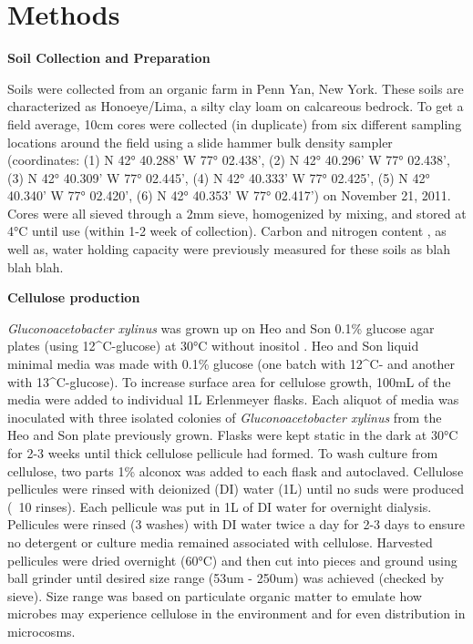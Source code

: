 \section{Methods}


\textbf{Soil Collection and Preparation}



Soils were collected from an organic farm in Penn Yan, New York.  These soils are characterized as Honoeye/Lima, a silty clay loam on calcareous bedrock.  To get a field average, 10cm cores were collected (in duplicate) from six different sampling locations around the field using a slide hammer bulk density sampler (coordinates: (1) N 42° 40.288’ W 77° 02.438’, (2) N 42° 40.296’ W 77° 02.438’, (3) N 42° 40.309’ W 77° 02.445’, (4) N 42° 40.333’ W 77° 02.425’, (5) N 42° 40.340’ W 77° 02.420’, (6) N 42° 40.353’ W 77° 02.417’) on November 21, 2011.   Cores were all sieved through a 2mm sieve, homogenized by mixing, and stored at 4°C until use (within 1-2 week of collection).  Carbon and nitrogen content , as well as, water holding capacity were previously measured for these soils as blah blah blah.     



\textbf{Cellulose production}



\textit{Gluconoacetobacter xylinus} was grown up on Heo and Son 0.1\% glucose agar plates (using 12^{C}-glucose) at 30°C without inositol \cite{Heo_Son_2002}.  Heo and Son liquid minimal media was made with 0.1\% glucose (one batch with 12^{C}- and another with 13^{C}-glucose).  To increase surface area for cellulose growth, 100mL of the media were added to individual 1L Erlenmeyer flasks.  Each aliquot of media was inoculated with three isolated colonies of \textit{Gluconoacetobacter xylinus} from the Heo and Son plate previously grown.  Flasks were kept static in the dark at 30°C for 2-3 weeks until thick cellulose pellicule had formed.  To wash culture from cellulose, two parts 1\% alconox was added to each flask and autoclaved.  Cellulose pellicules were rinsed with deionized (DI) water (1L) until no suds were produced (~10 rinses).  Each pellicule was put in 1L of DI water for overnight dialysis.  Pellicules were rinsed (3 washes) with DI water twice a day for 2-3 days to ensure no detergent or culture media remained associated with cellulose.  Harvested pellicules were dried overnight (60°C) and then cut into pieces and ground using ball grinder until desired size range (53um - 250um) was achieved (checked by sieve).  Size range was based on particulate organic matter to emulate how microbes may experience cellulose in the environment and for even distribution in microcosms.                    



